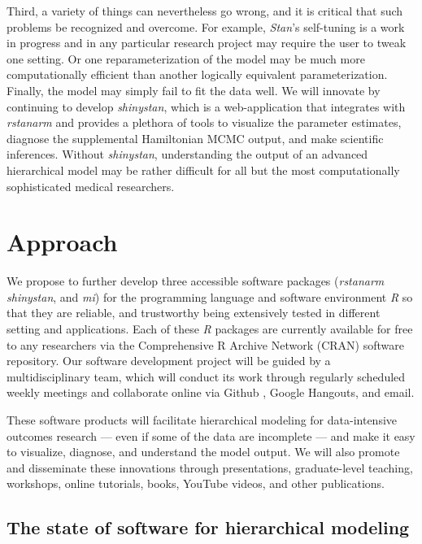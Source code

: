 \documentclass[11pt,notitlepage]{article}
\begin{document}
Third, a variety of things can nevertheless go wrong, and it is critical that such
problems be recognized and overcome. For example, \textit{Stan}'s self-tuning is a 
work in progress and in any particular research project may require the user to tweak 
one setting. Or one reparameterization of the model may be much more computationally efficient 
than another logically equivalent parameterization. Finally, the model may simply fail to fit the data well.
We will innovate by continuing to develop \textit{shinystan}, which is a web-application
that integrates with \textit{rstanarm} and provides a plethora of tools to visualize the 
parameter estimates, diagnose the supplemental Hamiltonian MCMC output, and make scientific
inferences. Without \textit{shinystan}, understanding the output of an advanced hierarchical model may be rather difficult
for all but the most computationally sophisticated medical researchers.

\section*{Approach}

We propose to further develop three accessible software packages (\textit{rstanarm} 
\textit{shinystan}, and \textit{mi}) for the programming language and software environment 
\textit{R} so that they are reliable, and trustworthy being extensively tested in different setting and applications. 
Each of these \textit{R} packages are currently available for free to any researchers via the Comprehensive R Archive Network (CRAN) 
software repository. Our software development project will be guided by a multidisciplinary 
team, which will conduct its work through regularly scheduled weekly meetings and collaborate online via Github 
\cite{Chacon2009ProGit}, Google Hangouts, and email.

These software products will facilitate hierarchical modeling for data-intensive outcomes research ---
even if some of the data are incomplete --- and make it easy to visualize, diagnose, and understand the model
output. We will also promote and disseminate these innovations through presentations, graduate-level teaching, 
workshops, online tutorials, books, YouTube videos, and other publications.

\subsection*{The state of software for hierarchical modeling}
\end{document}
